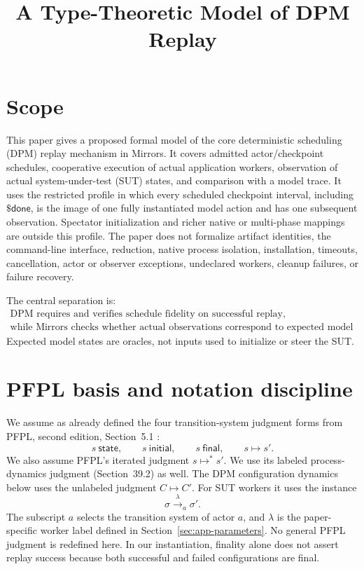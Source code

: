 \documentclass{article}
\title{A Type-Theoretic Model of DPM Replay}
\author{}
\date{}
\newcommand{\CPDone}{\mathsf{\$done}}
\begin{document}
\maketitle

\section{Scope}

This paper gives a proposed formal model of the core deterministic scheduling
(DPM) replay mechanism in Mirrors. It covers admitted actor/checkpoint
schedules, cooperative execution of actual application workers, observation of
actual system-under-test (SUT) states, and comparison with a model trace. It
uses the restricted profile in which every scheduled checkpoint interval,
including $\CPDone$, is the image of one fully instantiated model action and
has one subsequent observation. Spectator initialization and richer native or
multi-phase mappings are outside this profile. The paper does not formalize
artifact identities, the command-line interface, reduction, native process
isolation, installation, timeouts, cancellation, actor or observer exceptions,
undeclared workers, cleanup failures, or failure recovery.

The central separation is:
\[
  \begin{gathered}
    \text{DPM requires and verifies schedule fidelity on successful replay,}\\
    \text{while Mirrors checks whether actual observations correspond to
      expected model states.}
  \end{gathered}
\]
Expected model states are oracles, not inputs used to initialize or steer the
SUT.

\section{PFPL basis and notation discipline}

We assume as already defined the four transition-system judgment forms from
PFPL, second edition, Section~5.1 \cite{pfpl}:
\[
  s\ \mathsf{state},\qquad
  s\ \mathsf{initial},\qquad
  s\ \mathsf{final},\qquad
  s\longmapsto s'.
\]
We also assume PFPL's iterated judgment $s\longmapsto^{*}s'$. We use its
labeled process-dynamics judgment (Section~39.2) as well. The DPM
configuration dynamics below uses the unlabeled judgment $C\longmapsto C'$.
For SUT workers it uses the instance
\[
  \sigma\xrightarrow{\lambda}_{a}\sigma'.
\]
The subscript $a$ selects the transition system of actor $a$, and $\lambda$ is
the paper-specific worker label defined in Section~\ref{sec:app-parameters}.
No general PFPL judgment is redefined here. In our instantiation, finality
alone does not assert replay success because both successful and failed
configurations are final.
\end{document}
